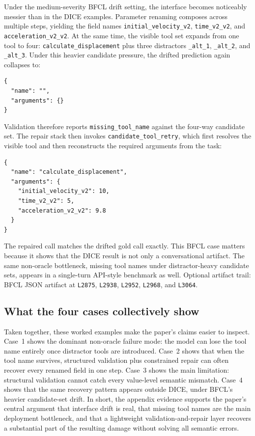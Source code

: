 \documentclass{svproc}
\newcommand{\artifactlink}[2]{#2}
\newcommand{\artifactref}[2]{\texttt{L#2}}
\newcommand{\bfclrunfile}{outputs/bfcl/bfcl-live-20260414-170241-830717/bfcl_results.json}
\newcommand{\bfclrunlink}{\artifactlink{\bfclrunfile}{BFCL JSON artifact}}
\begin{document}
Under the medium-severity BFCL drift setting, the interface becomes noticeably
messier than in the DICE examples. Parameter renaming composes across multiple
steps, yielding the field names \texttt{initial\_velocity\_v2},
\texttt{time\_v2\_v2}, and \texttt{acceleration\_v2\_v2}. At the same time, the
visible tool set expands from one tool to four:
\texttt{calculate\_displacement} plus three distractors
\texttt{\_alt\_1}, \texttt{\_alt\_2}, and \texttt{\_alt\_3}. Under this heavier
candidate pressure, the drifted prediction again collapses to:

\begin{verbatim}
{
  "name": "",
  "arguments": {}
}
\end{verbatim}

Validation therefore reports \texttt{missing\_tool\_name} against the four-way
candidate set. The repair stack then invokes \texttt{candidate\_tool\_retry},
which first resolves the visible tool and then reconstructs the required
arguments from the task:

\begin{verbatim}
{
  "name": "calculate_displacement",
  "arguments": {
    "initial_velocity_v2": 10,
    "time_v2_v2": 5,
    "acceleration_v2_v2": 9.8
  }
}
\end{verbatim}

The repaired call matches the drifted gold call exactly. This BFCL case matters
because it shows that the DICE result is not only a conversational artifact. The
same non-oracle bottleneck, missing tool names under distractor-heavy candidate
sets, appears in a single-turn API-style benchmark as well. Optional artifact
trail: \bfclrunlink{} at \artifactref{\bfclrunfile}{2875},
\artifactref{\bfclrunfile}{2938}, \artifactref{\bfclrunfile}{2952},
\artifactref{\bfclrunfile}{2968}, and \artifactref{\bfclrunfile}{3064}.

\subsection{What the four cases collectively show}
Taken together, these worked examples make the paper's claims easier to inspect.
Case~1 shows the dominant non-oracle failure mode: the model can lose the tool
name entirely once distractor tools are introduced. Case~2 shows that when the
tool name survives, structured validation plus constrained repair can often
recover every renamed field in one step. Case~3 shows the main limitation:
structural validation cannot catch every value-level semantic mismatch. Case~4
shows that the same recovery pattern appears outside DICE, under BFCL's heavier
candidate-set drift. In short, the appendix evidence supports the paper's central
argument that interface drift is real, that missing tool names are the main
deployment bottleneck, and that a lightweight validation-and-repair layer
recovers a substantial part of the resulting damage without solving all semantic
errors.
\end{document}

